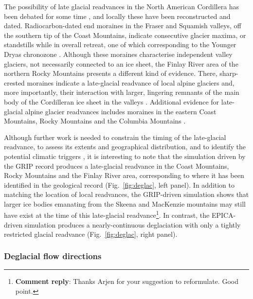 \documentclass[tc, manuscript]{copernicus}
\newcommand{\renote}[1]{\footnote{\textbf{Comment reply}: #1}}
\begin{document}
The possibility of late glacial readvances in the North American Cordillera has
been debated for some time \citep{Osborn.Gerloff.1997}, and locally these have
been reconstructed and dated. Radiocarbon-dated end moraines in the Fraser and
Squamish valleys, off the southern tip of the Coast Mountains, indicate
consecutive glacier maxima, or standstills while in overall retreat, one of
which corresponding to the Younger Dryas chronozone \citep{Clague.etal.1997,
Friele.Clague.2002, Friele.Clague.2002a, Kovanen.2002,
Kovanen.Easterbrook.2002}. Although these moraines characterise independent
valley glaciers, not necessarily connected to an ice sheet, the Finlay River
area of the northern Rocky Mountains presents a different kind of evidence.
There, sharp-crested moraines indicate a late-glacial readvance of local alpine
glaciers and, more importantly, their interaction with larger, lingering
remnants of the main body of the Cordilleran ice sheet in the valleys
\citep{Lakeman.etal.2008}. Additional evidence for late-glacial
alpine glacier readvances includes moraines in the eastern Coast Mountains,
Rocky Mountains and the Columbia Mountains \citep{Osborn.Gerloff.1997,
Menounos.etal.2008}.

Although further work is needed to constrain the timing of the late-glacial
readvance, to assess its extents and geographical distribution, and to identify
the potential climatic triggers \citep{Menounos.etal.2008}, it is interesting
to note that the simulation driven by the GRIP record produces a late-glacial
readvance in the Coast Mountains, Rocky Mountains and the Finlay River area,
corresponding to where it has been identified in the geological record
(Fig.~\ref{fig:deglac}, left panel). In addition to matching the location of
local readvances, the GRIP-driven simulation shows that larger ice bodies
emanating from the Skeena and MacKenzie mountains may still have exist at the
time of this late-glacial readvance\renote{
    Thanks Arjen for your suggestion to reformulate. Good point.}.
In contrast, the EPICA-driven simulation produces a nearly-continuous
deglaciation with only a tightly restricted glacial readvance
(Fig.~\ref{fig:deglac}, right panel).


\subsubsection{Deglacial flow directions}
\end{document}
